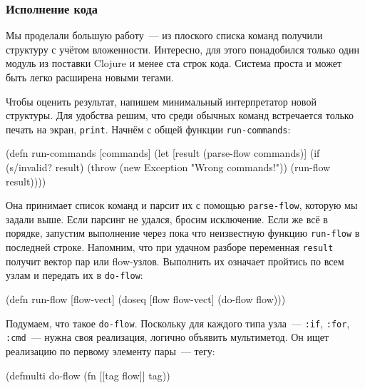 \subsubsection{Исполнение кода}


Мы проделали большую работу~--- из плоского списка команд получили структуру с
учётом вложенности. Интересно, для этого понадобился только один модуль из
поставки Clojure и менее ста строк кода. Система проста и может быть легко
расширена новыми тегами.

Чтобы оценить результат, напишем минимальный интерпретатор новой структуры. Для
удобства решим, что среди обычных команд встречается только печать на экран,
\texttt{print}. Начнём с общей функции \texttt{run-commands}:

\begin{english}
  \begin{clojure}
(defn run-commands [commands]
  (let [result (parse-flow commands)]
    (if (s/invalid? result)
      (throw (new Exception "Wrong commands!"))
      (run-flow result))))
  \end{clojure}
\end{english}

Она принимает список команд и парсит их с помощью \texttt{parse-flow}, которую
мы задали выше. Если парсинг не удался, бросим исключение. Если же всё в
порядке, запустим выполнение через пока что неизвестную функцию
\texttt{run-flow} в последней строке. Напомним, что при удачном разборе
переменная \texttt{result} получит вектор пар или flow-узлов. Выполнить их
означает пройтись по всем узлам и передать их в \texttt{do-flow}:

\begin{english}
  \begin{clojure}
(defn run-flow [flow-vect]
  (doseq [flow flow-vect]
    (do-flow flow)))
  \end{clojure}
\end{english}

Подумаем, что такое \texttt{do-flow}. Поскольку для каждого типа узла~---
\verb|:if|, \verb|:for|, \verb|:cmd|~--- нужна своя реализация, логично объявить
мультиметод. Он ищет реализацию по первому элементу пары~--- тегу:

\begin{english}
  \begin{clojure}
(defmulti do-flow
  (fn [[tag flow]]
    tag))
  \end{clojure}
\end{english}

